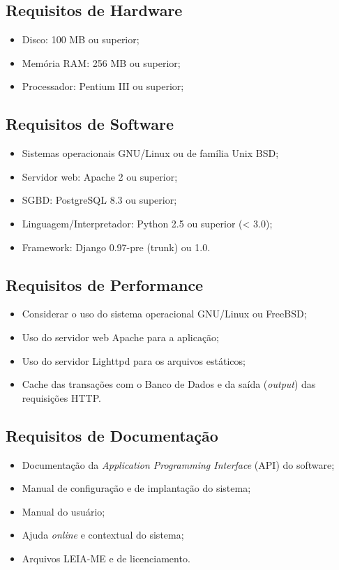 \subsection{Requisitos de Hardware}
\begin{itemize}
\item Disco: 100 MB ou superior;
\item Memória RAM: 256 MB ou superior;
\item Processador: Pentium III ou superior;
\end{itemize}

\subsection{Requisitos de Software}
\begin{itemize}
\item Sistemas operacionais GNU/Linux ou de família Unix BSD;
\item Servidor web: Apache 2 ou superior;
\item SGBD: PostgreSQL 8.3 ou superior;
\item Linguagem/Interpretador: Python 2.5 ou superior (< 3.0);
\item Framework: Django 0.97-pre (trunk) ou 1.0.
\end{itemize}

\subsection{Requisitos de Performance}
\begin{itemize}
\item Considerar o uso do sistema operacional GNU/Linux ou FreeBSD;
\item Uso do servidor web Apache para a aplicação;
\item Uso do servidor Lighttpd para os arquivos estáticos;
\item Cache das transações com o Banco de Dados e da saída
  (\textit{output}) das requisições HTTP.
\end{itemize}

\subsection{Requisitos de Documentação}
\begin{itemize}
\item Documentação da \textit{Application Programming Interface} (API)
  do software;
\item Manual de configuração e de implantação do sistema;
\item Manual do usuário;
\item Ajuda \textit{online} e contextual do sistema;
\item Arquivos LEIA-ME e de licenciamento.
\end{itemize}

